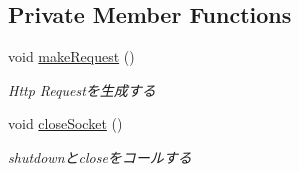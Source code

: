 \subsection*{Private Member Functions}
\begin{DoxyCompactItemize}
\item 
void \mbox{\hyperlink{class_session_1_1_http_get_sequence_aa2af851135d98396c135edac23f9a4a0}{make\+Request}} ()
\begin{DoxyCompactList}\small\item\em Http Requestを生成する \end{DoxyCompactList}\item 
\mbox{\label{class_session_1_1_http_get_sequence_ab79d4fbfab721aabfdf3903ae6f5a577}} 
void \mbox{\hyperlink{class_session_1_1_http_get_sequence_ab79d4fbfab721aabfdf3903ae6f5a577}{close\+Socket}} ()
\begin{DoxyCompactList}\small\item\em shutdownとcloseをコールする \end{DoxyCompactList}\end{DoxyCompactItemize}

